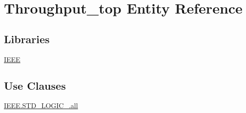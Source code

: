 \hypertarget{class_throughput__top}{\section{Throughput\-\_\-top Entity Reference}
\label{class_throughput__top}
}
\subsection*{Libraries}
 \begin{DoxyCompactItemize}
\item 
\hypertarget{class_throughput__top_a6bb9ba019ee6cb65f2423fce8f589a21}{\hyperlink{class_throughput__top_a6bb9ba019ee6cb65f2423fce8f589a21}{I\-E\-E\-E} }\label{class_throughput__top_a6bb9ba019ee6cb65f2423fce8f589a21}

\end{DoxyCompactItemize}
\subsection*{Use Clauses}
 \begin{DoxyCompactItemize}
\item 
\hypertarget{class_throughput__top_a51009fbfe572edbd15834ae3040ac626}{\hyperlink{class_throughput__top_a51009fbfe572edbd15834ae3040ac626}{I\-E\-E\-E.\-S\-T\-D\-\_\-\-L\-O\-G\-I\-C\-\_.\-all}   }\label{class_throughput__top_a51009fbfe572edbd15834ae3040ac626}

\end{DoxyCompactItemize}
